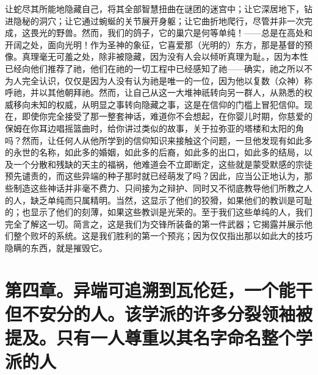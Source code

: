 让蛇尽其所能地隐藏自己，将其全部智慧扭曲在谜团的迷宫中；让它深居地下，钻进隐秘的洞穴；让它通过蜿蜒的关节展开身躯；让它曲折地爬行，尽管并非一次完成，这畏光的野兽。然而，我们的鸽子，它的巢穴是何等单纯！——总是在高处和开阔之处，面向光明！作为圣神的象征，它喜爱那（光明的）东方，那是基督的预像。真理毫无可羞之处，除非被隐藏，因为没有人会以倾听真理为耻。，因为本性已经向他们推荐了祂，他们在祂的一切工程中已经感知了祂——确实，祂之所以不为人完全认识，仅仅是因为人没有认为祂是唯一的一位，因为他以复数（众神）称呼祂，并以其他朝拜祂。然而，让自己从这一大堆神祇转向另一群人，从熟悉的权威移向未知的权威，从明显之事转向隐藏之事，这是在信仰的门槛上冒犯信仰。现在，即使你完全接受了那一整套神话，难道你不会想起，在你婴儿时期，你慈爱的保姆在你耳边唱摇篮曲时，给你讲过类似的故事，关于拉弥亚的塔楼和太阳的角吗？然而，让任何人从他所学到的信仰知识来接触这个问题，一旦他发现有如此多的永世的名称，如此多的婚姻，如此多的后裔，如此多的出口，如此多的结局，以及一个分散和残缺的天主的福祸，他难道会不立即断定，这些就是蒙受默感的宗徒预先谴责的，而这些异端的种子那时就已经萌发了吗？因此，应当公正地认为，那些制造这些神话并非毫不费力、只间接为之辩护、同时又不彻底教导他们所教之人的人，缺乏单纯而只属精明。当然，这显示了他们的狡猾，如果他们的教训是可耻的；也显示了他们的刻薄，如果这些教训是光荣的。至于我们这些单纯的人，我们完全了解这一切。简言之，这是我们为交锋所装备的第一件武器；它揭露并展示他们整个败坏的系统。这是我们胜利的第一个预兆；因为仅仅指出那以如此大的技巧隐瞒的东西，就是摧毁它。\par


\section{第四章。异端可追溯到瓦伦廷，一个能干但不安分的人。该学派的许多分裂领袖被提及。只有一人尊重以其名字命名整个学派的人}

